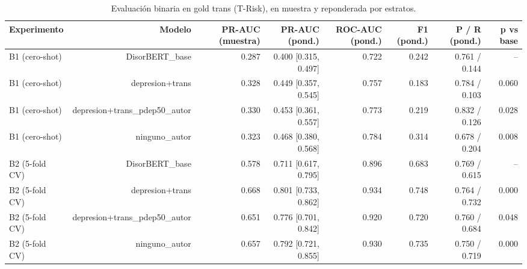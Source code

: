 \begin{table}[htbp]
\centering
\caption{Evaluación binaria en gold trans (T-Risk), en muestra y reponderada por estratos.}
\label{tab:trisk_binario}
\begin{tabular}{lrrrrrrr}
\toprule
Experimento & Modelo & PR-AUC (muestra) & PR-AUC (pond.) & ROC-AUC (pond.) & F1 (pond.) & P / R (pond.) & p vs base \\
\midrule
B1 (cero-shot) & DisorBERT\_base & 0.287 & 0.400 [0.315, 0.497] & 0.722 & 0.242 & 0.761 / 0.144 & -- \\
B1 (cero-shot) & depresion+trans & 0.328 & 0.449 [0.357, 0.545] & 0.757 & 0.183 & 0.784 / 0.103 & 0.060 \\
B1 (cero-shot) & depresion+trans\_pdep50\_autor & 0.330 & 0.453 [0.361, 0.557] & 0.773 & 0.219 & 0.832 / 0.126 & 0.028 \\
B1 (cero-shot) & ninguno\_autor & 0.323 & 0.468 [0.380, 0.568] & 0.784 & 0.314 & 0.678 / 0.204 & 0.008 \\
B2 (5-fold CV) & DisorBERT\_base & 0.578 & 0.711 [0.617, 0.795] & 0.896 & 0.683 & 0.769 / 0.615 & -- \\
B2 (5-fold CV) & depresion+trans & 0.668 & 0.801 [0.733, 0.862] & 0.934 & 0.748 & 0.764 / 0.732 & 0.000 \\
B2 (5-fold CV) & depresion+trans\_pdep50\_autor & 0.651 & 0.776 [0.701, 0.842] & 0.920 & 0.720 & 0.760 / 0.684 & 0.048 \\
B2 (5-fold CV) & ninguno\_autor & 0.657 & 0.792 [0.721, 0.855] & 0.930 & 0.735 & 0.750 / 0.719 & 0.000 \\
\bottomrule
\end{tabular}
\end{table}
